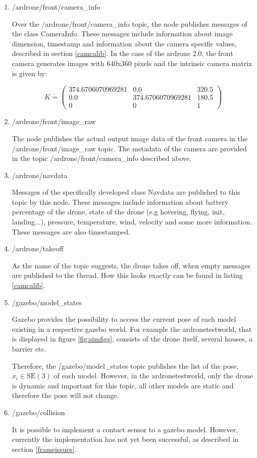 	\begin{enumerate}
	
	\item{/ardrone/front/camera\_info}
	
	Over the /ardrone/front/camera\_info topic, the node publishes messages of the class CameraInfo. These messages include information about 
	image dimension, timestamp and information about the camera specific values, described in section \ref{camcalib}. In the case of the ardrone 2.0,
	the front camera generates images with 640x360 pixels and the intrinsic camera matrix is given by: 
	
	$$K = \begin{pmatrix} 374.6706070969281 & 0.0 & 320.5 \\
						  0.0 & 374.6706070969281 & 180.5 \\ 
						  0 & 0 & 1 \end{pmatrix}$$
	
	\item{/ardrone/front/image\_raw}
	
	The node publishes the actual output image data of the front camera in the /ardrone/front/image\_raw topic. The metadata of the camera are provided in the topic /ardrone/front/camera\_info described above. 
	
	\item{/ardrone/navdata}
	
	Messages of the specifically developed class Navdata are published to this topic by this node. These messages include information about 
	battery percentage of the drone, state of the drone (e.g hovering, flying, init, landing...), pressure, temperature, wind, velocity and 
    some more information. These messages are also timestamped. 	
	
	\item{/ardrone/takeoff}
	
	As the name of the topic suggests, the drone takes off, when empty messages are published to the thread. How this looks exactly can be found in 
	listing \ref{camcalib}.
	
	\item{/gazebo/model\_states}
	
	Gazebo provides the possibility to access the current pose of each model existing in a respective gazebo world. For example the ardronetestworld, 
	that is displayed in figure \ref{fig:simfigs}, consists of the drone itself, several houses, a barrier etc.
	
	Therefore, the /gazebo/model\_states topic 
	publishes the list of the pose, $x_i \in \text{SE}(3)$ of each model. However, in the ardronetestworld, only the drone is dynamic and important for this topic, all other models 
	are static and therefore the pose will not change. 
	
	\item{/gazebo/collision}
	
	It is possible to implement a contact sensor to a gazebo model.
	However, currently the implementation has not yet been successful, as described in section \ref{frameissues}. 
	
	\end{enumerate}
	
